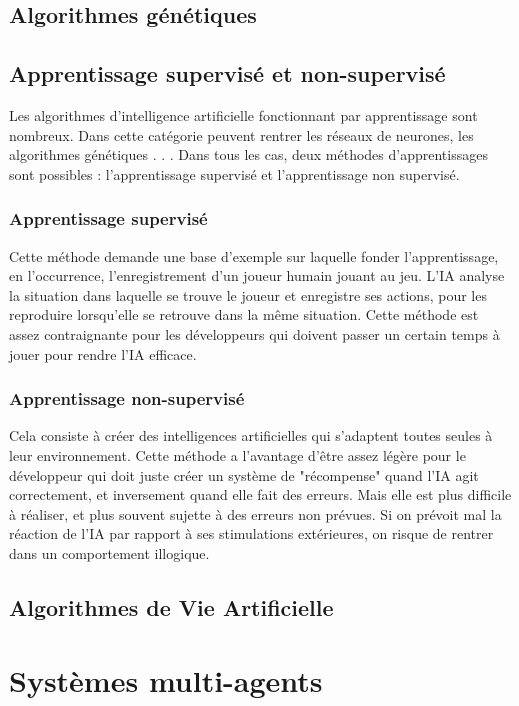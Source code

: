\documentclass[asi]{picINSA}
\begin{document}
\section{Algorithmes génétiques}
\section{Apprentissage supervisé et non-supervisé}
Les algorithmes d’intelligence artificielle fonctionnant par apprentissage sont nombreux. Dans cette catégorie peuvent rentrer les réseaux de neurones, les algorithmes génétiques . . . Dans tous les cas, deux méthodes d’apprentissages sont possibles : l’apprentissage supervisé et l’apprentissage non supervisé.

\subsection{Apprentissage supervisé}
Cette méthode demande une base d’exemple sur laquelle fonder l’apprentissage, en l’occurrence, l’enregistrement d’un joueur humain jouant au jeu. L’IA analyse la situation dans laquelle se trouve le joueur et enregistre ses actions, pour les reproduire lorsqu’elle se retrouve dans la même situation. Cette méthode est assez contraignante pour les développeurs qui doivent passer un certain temps à jouer pour rendre l’IA efficace.

\subsection{Apprentissage non-supervisé}
Cela consiste à créer des intelligences artificielles qui s’adaptent toutes seules à leur environnement. Cette méthode a l’avantage d’être assez légère pour le développeur qui doit juste créer un système de "récompense" quand l’IA agit correctement, et inversement  quand elle fait des erreurs. Mais elle est plus difficile à réaliser, et plus souvent sujette à des erreurs non prévues. Si on prévoit mal la réaction de l’IA par rapport à ses stimulations extérieures, on risque de rentrer dans un comportement illogique.
\section{Algorithmes de Vie Artificielle}
  
\chapter{Systèmes multi-agents}
\end{document}
